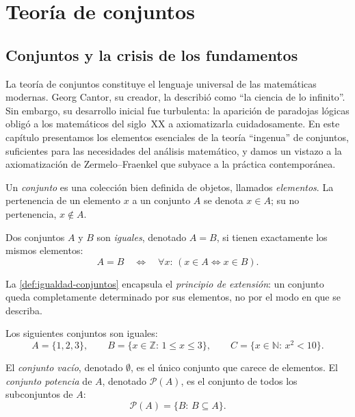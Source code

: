 \chapter{Teoría de conjuntos}
\label{ap:teoria-conjuntos}

\section{Conjuntos y la crisis de los fundamentos}

La teoría de conjuntos constituye el lenguaje universal de las matemáticas modernas. Georg Cantor, su creador, la describió como ``la ciencia de lo infinito''. Sin embargo, su desarrollo inicial fue turbulenta: la aparición de paradojas lógicas obligó a los matemáticos del siglo~XX a axiomatizarla cuidadosamente. En este capítulo presentamos los elementos esenciales de la teoría ``ingenua'' de conjuntos, suficientes para las necesidades del análisis matemático, y damos un vistazo a la axiomatización de Zermelo--Fraenkel que subyace a la práctica contemporánea.

Un \emph{conjunto} es una colección bien definida de objetos, llamados \emph{elementos}. La pertenencia de un elemento $x$ a un conjunto $A$ se denota $x\in A$; su no pertenencia, $x\notin A$.

\begin{definition}
\label{def:igualdad-conjuntos}
Dos conjuntos $A$ y $B$ son \emph{iguales}, denotado $A=B$, si tienen exactamente los mismos elementos:
\[
  A=B\quad\Longleftrightarrow\quad\forall x:\,(x\in A\Leftrightarrow x\in B).
\]
\end{definition}

La \cref{def:igualdad-conjuntos} encapsula el \emph{principio de extensión}: un conjunto queda completamente determinado por sus elementos, no por el modo en que se describa.

\begin{example}
\label{ej:descripciones}
Los siguientes conjuntos son iguales:
\[
  A=\{1,2,3\},\qquad B=\{x\in\mathbb{Z}:\,1\leq x\leq 3\},\qquad C=\{x\in\mathbb{N}:\,x^2<10\}.
\]
\end{example}

\begin{definition}
\label{def:conjuntos-especiales}
El \emph{conjunto vacío}, denotado $\emptyset$, es el único conjunto que carece de elementos. El \emph{conjunto potencia} de $A$, denotado $\mathcal{P}(A)$, es el conjunto de todos los subconjuntos de $A$:
\[
  \mathcal{P}(A)=\{B:\,B\subseteq A\}.
\]
\end{definition}

